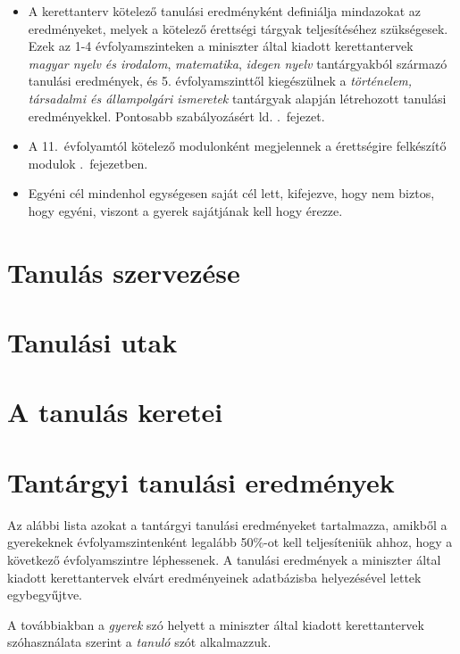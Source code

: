 \documentclass[magyar,12pt,a4paper,oneside,draft]{report}
\begin{document}
\begin{itemize}
    \item A kerettanterv kötelező tanulási eredményként definiálja mindazokat
          az
          eredményeket, melyek a kötelező érettségi tárgyak teljesítéséhez
          szükségesek. Ezek az 1-4 évfolyamszinteken a miniszter által kiadott
          kerettantervek
          \emph{magyar nyelv és irodalom}, \emph{matematika}, \emph{idegen
              nyelv}
          tantárgyakból
          származó tanulási eredmények, és 5. évfolyamszinttől kiegészülnek a
          \emph{történelem, társadalmi és állampolgári ismeretek} tantárgyak
          alapján
          létrehozott tanulási eredményekkel. Pontosabb szabályozásért ld.
          .~fejezet.
    \item A 11.~évfolyamtól kötelező modulonként megjelennek a érettségire
          felkészítő
          modulok .~fejezetben.
      

    \item  Egyéni cél mindenhol egységesen saját cél lett, kifejezve, hogy nem
          biztos, hogy egyéni, viszont a gyerek sajátjának kell hogy érezze.
\end{itemize}
\newpage


\chapter{Tanulás szervezése}


\chapter{Tanulási utak}


\chapter{A tanulás keretei}


\chapter{Tantárgyi tanulási eredmények}
\label{sec:tantargyi_tanulasi_eredmenyek}
Az alábbi lista azokat a tantárgyi tanulási eredményeket tartalmazza, amikből a
gyerekeknek évfolyamszintenként legalább 50\%-ot kell teljesíteniük ahhoz, hogy
a következő évfolyamszintre léphessenek.
A tanulási eredmények a miniszter
által kiadott kerettantervek\cite{ofi:kerettanterv}  elvárt eredményeinek
adatbázisba
helyezésével lettek egybegyűjtve.

A továbbiakban a \emph{gyerek} szó helyett a miniszter által kiadott
kerettantervek szóhasználata szerint a \emph{tanuló} szót alkalmazzuk.


{}
\label{sec:bibliographyk}

\end{document}

